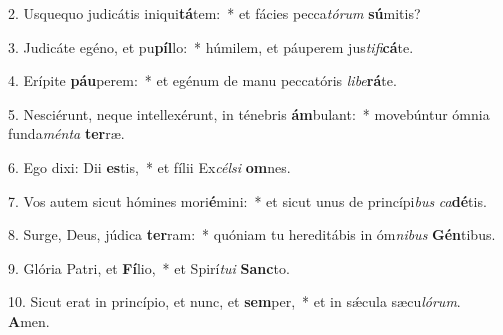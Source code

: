 2. Usquequo judicátis iniqui\textbf{tá}tem:~*  et fácies pecca\textit{tó}\textit{rum} \textbf{sú}mitis?\

3. Judicáte egéno, et pu\textbf{píl}lo:~*  húmilem, et páuperem jus\textit{ti}\textit{fi}\textbf{cá}te.\

4. Erípite \textbf{páu}perem:~*  et egénum de manu peccatóris \textit{li}\textit{be}\textbf{rá}te.\

5. Nesciérunt, neque intellexérunt, in ténebris \textbf{ám}bulant:~*  movebúntur ómnia funda\textit{mén}\textit{ta} \textbf{ter}ræ.\

6. Ego dixi: Dii \textbf{es}tis,~*  et fílii Ex\textit{cél}\textit{si} \textbf{om}nes.\

7. Vos autem sicut hómines mori\textbf{é}mini:~*  et sicut unus de princípi\textit{bus} \textit{ca}\textbf{dé}tis.\

8. Surge, Deus, júdica \textbf{ter}ram:~*  quóniam tu hereditábis in óm\textit{ni}\textit{bus} \textbf{Gén}tibus.\

9. Glória Patri, et \textbf{Fí}lio,~*  et Spirí\textit{tu}\textit{i} \textbf{Sanc}to.\

10. Sicut erat in princípio, et nunc, et \textbf{sem}per,~*  et in sǽcula sæcu\textit{ló}\textit{rum}. \textbf{A}men.\

